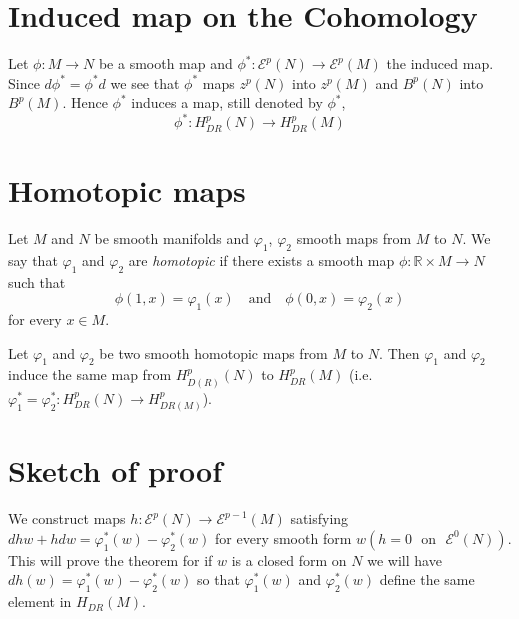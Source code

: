 \section*{Induced map on the Cohomology}

Let $\phi:M\to N$ be a smooth map and $\phi^{*}:\mathscr{E}^{p}(N)\to \mathscr{E}^{p}(M)$ the induced map. Since $d\phi^{*}=\phi^{*}d$ we see that $\phi^{*}$ maps $z^{p}(N)$ into $z^{p}(M)$ and $B^{p}(N)$ into $B^{p}(M)$. Hence $\phi^{*}$ induces a map, still denoted by $\phi^{*}$,
$$
\phi^{*}:H^{p}_{DR}(N)\to H^{p}_{DR}(M)
$$

\section*{Homotopic maps}

\begin{defi*}
Let $M$ and $N$ be smooth manifolds and $\varphi_{1}$, $\varphi_{2}$ smooth maps from $M$ to $N$. We say that $\varphi_{1}$ and $\varphi_{2}$ are {\em homotopic} if there exists a smooth map $\phi:\mathbb{R}\times M\to N$ such that
$$
\phi(1,x)=\varphi_{1}(x)\quad\text{and}\quad \phi(0,x)=\varphi_{2}(x)
$$
for every $x\in M$.
\end{defi*}

\begin{theorem}\label{chap4-thm4.2}
Let $\varphi_{1}$ and $\varphi_{2}$ be two smooth homotopic maps from $M$ to $N$. Then $\varphi_{1}$ and $\varphi_{2}$ induce the same map from $H^{p}_{D(R)}(N)$ to $H^{p}_{DR}(M)$ (i.e. $\varphi^{*}_{1}=\varphi^{*}_{2}:H^{p}_{DR}(N)\to H^{p}_{DR(M)}$).
\end{theorem}

\section*{Sketch of proof}

We construct maps $h:\mathscr{E}^{p}(N)\to \mathscr{E}^{p-1}(M)$ satisfying $dhw+hdw=\varphi^{*}_{1}(w)-\varphi^{*}_{2}(w)$ for every smooth form $w(h=0\text{~ on~ } \mathscr{E}^{0}(N))$. This will prove the theorem for if $w$ is a closed form on $N$ we will have\pageoriginale $dh(w)=\varphi^{*}_{1}(w)-\varphi^{*}_{2}(w)$ so that $\varphi^{*}_{1}(w)$ and $\varphi^{*}_{2}(w)$ define the same element in $H_{DR}(M)$.


